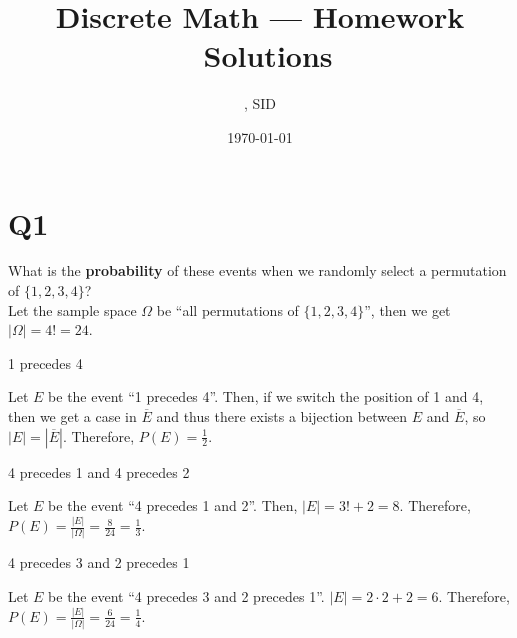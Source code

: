 \documentclass[11pt]{article}
\title{Discrete Math --- Homework \Homework \ Solutions}
\author{\Name, SID \SID}
\date{\today}
\begin{document}
\maketitle

\section*{Q1}
What is the \textbf{probability} of these events when we randomly
select a permutation of $\{ 1,2,3,4 \}$?\\
Let the sample space $\Omega$ be ``all permutations of $\{ 1,2,3,4 \}$'',
then we get $\left\vert \Omega \right\vert =4! = 24$.

\begin{qparts}
    
    \item 1 precedes 4
    \begin{solution}
        Let $E$ be the event ``1 precedes 4''. Then, if we switch the position of 1 and 4, then we get a case in $\overline{E}$ and thus there exists a bijection between $E$ and $\overline{E}$, so $\left\vert E \right\vert = \left\vert \overline{E} \right\vert $. Therefore, $P(E)=\frac{1}{2}$.
    \end{solution}

    \item 4 precedes 1 and 4 precedes 2
    \begin{solution}
        Let $E$ be the event ``4 precedes 1 and 2''. Then,
        $\left\vert E \right\vert=3!+2=8 $. Therefore, 
        $P(E)=\frac{\left\vert E  \right\vert }{\left\vert \Omega \right\vert }=\frac{8}{24}=\frac{1}{3}$.
    \end{solution}
    
    \item 4 precedes 3 and 2 precedes 1
    \begin{solution}
        Let $E$ be the event ``4 precedes 3 and 2 precedes 1''.
        $\left\vert E \right\vert =2\cdot 2+2=6$. Therefore, 
        $P(E)=\frac{\left\vert E  \right\vert}{\left\vert \Omega \right\vert }=\frac{6}{24}=\frac{1}{4}$.
    \end{solution}
\end{qparts}
\end{document}
